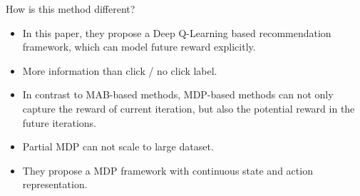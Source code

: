 \begin{frame}{How is this method different?}
   \begin{itemize}
       \item In this paper, they propose a Deep Q-Learning based recommendation framework, which can model future reward explicitly.
       \item More information than click / no click label.
       \item In contrast to MAB-based methods, MDP-based methods can not only capture the reward of current iteration, but also the potential reward in the future iterations.
      \item Partial MDP can not scale to large dataset.
      \item They propose a MDP framework with continuous state and action representation.
\end{itemize}
\end{frame}












 



